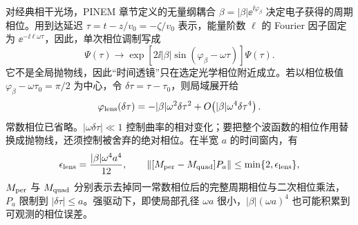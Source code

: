 对经典相干光场，PINEM 章节定义的无量纲耦合 $\beta=|\beta|\ee^{\ii\varphi_\beta}$ 决定电子获得的周期相位。用到达延迟 $\tau=t-z/v_0=-\zeta/v_0$ 表示，能量阶数 $\ell$ 的 Fourier 因子固定为 $\ee^{-\ii\ell\omega\tau}$，因此，单次相位调制写成
\begin{equation}
{
\Psi(\tau)\longrightarrow
\exp\!\left[2\ii|\beta|\sin(\varphi_\beta-\omega\tau)\right]\Psi(\tau).}
\label{eq:electron_periodic_time_phase}
\end{equation}
它不是全局抛物线，因此“时间透镜”只在选定光学相位附近成立。若以相位极值 $\varphi_\beta-\omega\tau_0=\pi/2$ 为中心，令 $\delta\tau=\tau-\tau_0$，则局域展开给
\begin{equation}
{
\varphi_{\rm lens}(\delta\tau)
=-|\beta|\omega^2\delta\tau^2
+O\!\left(|\beta|\omega^4\delta\tau^4\right).}
\label{eq:electron_local_time_lens_phase}
\end{equation}
常数相位已省略。$|\omega\delta\tau|\ll1$ 控制曲率的相对变化；要把整个波函数的相位作用替换成抛物线，还须控制被舍弃的绝对相位。在半宽 $a$ 的时间窗内，有
\begin{equation}
\epsilon_{\rm lens}=\frac{|\beta|\omega^4a^4}{12},\qquad
\|[M_{\rm per}-M_{\rm quad}]P_a\|
\le\min\{2,\epsilon_{\rm lens}\},
\label{eq:electron-time-lens-absolute-error}
\end{equation}
$M_{\rm per}$ 与 $M_{\rm quad}$ 分别表示去掉同一常数相位后的完整周期相位与二次相位乘法，$P_a$ 限制到 $|\delta\tau|\le a$。强驱动下，即使局部孔径 $\omega a$ 很小，$|\beta|(\omega a)^4$ 也可能积累到可观测的相位误差。

